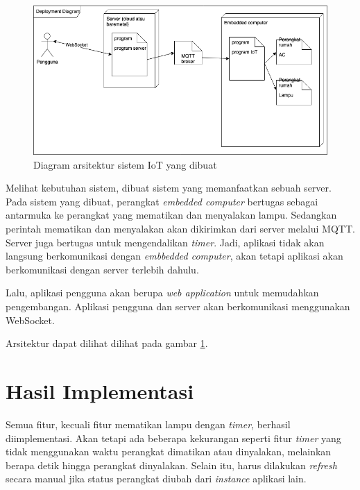 \documentclass[conference]{IEEEtran}
\begin{document}
\begin{figure}[htbp]
\centerline{\includegraphics[scale=0.3]{diagrams/deployment-diagram.png}}
\caption{Diagram arsitektur sistem IoT yang dibuat}
\label{diag-deploy-diag}
\end{figure}

Melihat kebutuhan sistem, dibuat sistem yang memanfaatkan sebuah server.
Pada sistem yang dibuat, perangkat \textit{embedded computer} bertugas
sebagai antarmuka ke perangkat yang mematikan dan menyalakan lampu.
Sedangkan perintah mematikan dan menyalakan akan dikirimkan dari server
melalui MQTT. Server juga bertugas untuk mengendalikan \textit{timer}.
Jadi, aplikasi tidak akan langsung berkomunikasi dengan \textit{embbedded
computer}, akan tetapi aplikasi akan berkomunikasi dengan server terlebih
dahulu.

Lalu, aplikasi pengguna akan berupa \textit{web application} untuk
memudahkan pengembangan. Aplikasi pengguna dan server akan berkomunikasi
menggunakan WebSocket.

Arsitektur dapat dilihat dilihat pada gambar \ref{diag-deploy-diag}.

\section{Hasil Implementasi}\label{sect-hasil}
Semua fitur, kecuali fitur mematikan lampu dengan \textit{timer}, berhasil
diimplementasi. Akan tetapi ada beberapa kekurangan seperti fitur
\textit{timer} yang tidak menggunakan waktu perangkat dimatikan atau
dinyalakan, melainkan berapa detik hingga perangkat dinyalakan. Selain
itu, harus dilakukan \textit{refresh} secara manual jika status perangkat
diubah dari \textit{instance} aplikasi lain.
\end{document}
